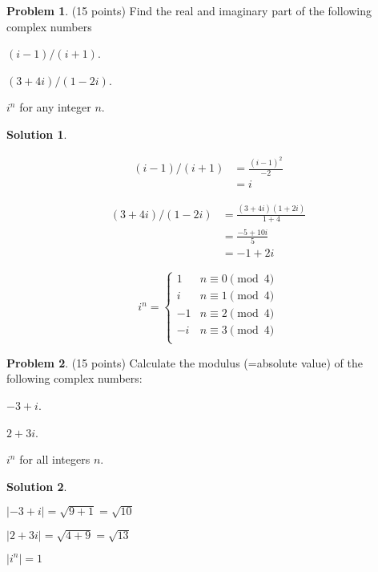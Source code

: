 \documentclass{article}
\theoremstyle{definition}
\newtheorem{problem}{Problem}
\newtheorem*{solution}{Solution}
\begin{document}
\begin{problem} (15 points) 
Find the real and imaginary part of the following complex numbers
\begin{compactenum}[(a)]
\item $(i-1)/(i+1)$.
\item $(3+4i)/(1-2i)$. 
\item $i^n$ for any integer $n$.
\end{compactenum}
\end{problem} 
\begin{solution}
\begin{compactenum}[(a)]
\item 
\begin{align*}
(i-1)/(i+1) & = \frac{(i-1)^2}{-2} \\
& = i 
\end{align*}
\item 
\begin{align*}
(3+4i)/(1-2i) & = \frac{(3+4i)(1+2i)}{1 + 4}\\
& = \frac{-5 + 10i}{5}\\
& = -1 + 2i
\end{align*}
\item 
\[
i^n = \begin{cases} 
      1 & n \equiv 0 \pmod 4 \\
      i & n \equiv 1 \pmod 4 \\
      -1 & n \equiv 2 \pmod 4 \\
      -i & n \equiv 3 \pmod 4 \\
   \end{cases}
\]
\end{compactenum}
\end{solution}

\begin{problem} (15 points) 
Calculate the modulus (=absolute value) of the following complex numbers: 
\begin{compactenum}[(a)]
\item $-3+i$.
\item $2+3i$.
\item $i^n$ for all integers $n$. 
\end{compactenum}
\end{problem}
\begin{solution}
\begin{compactenum}[(a)]
\item $|-3+i| = \sqrt{9 + 1} = \sqrt{10}$
\item $|2+3i| = \sqrt{4 + 9} = \sqrt{13}$
\item $|i^n| = 1$
\end{compactenum}
\end{solution}
\end{document}
